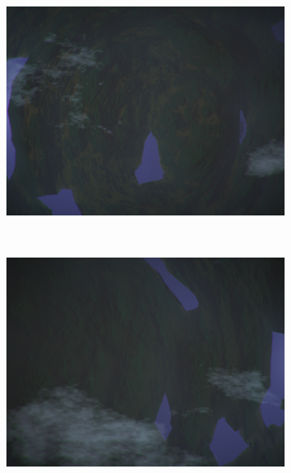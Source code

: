 \documentclass[a4paper, 10pt]{article}
\begin{document}
\begin{figure}[H]
\centering
\begin{subfigure}[t]{0.5\textwidth}
\centering
\includegraphics[width=\textwidth]{Image0005.png}
\end{subfigure}%
~
\begin{subfigure}[t]{0.5\textwidth}
\centering
\includegraphics[width=\textwidth]{Image0006.png}
\end{subfigure}%
\quad
\begin{subfigure}[t]{0.5\textwidth}
\centering

\end{subfigure}
\end{figure}
\end{document}

